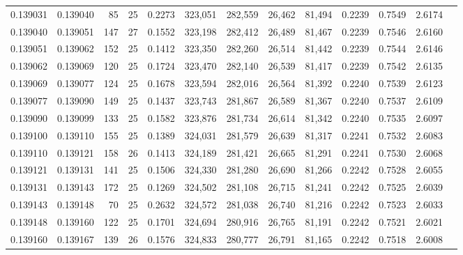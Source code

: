 \begin{tabular}{rrrrrrrrrrrrr}
0.139031 & 0.139040 &    85 &  25 &                                     0.2273 & 323,051 & 282,559 &  26,462 &  81,494 & 0.2239 & 0.7549 & 2.6174 \\
0.139040 & 0.139051 &   147 &  27 &                                     0.1552 & 323,198 & 282,412 &  26,489 &  81,467 & 0.2239 & 0.7546 & 2.6160 \\
0.139051 & 0.139062 &   152 &  25 &                                     0.1412 & 323,350 & 282,260 &  26,514 &  81,442 & 0.2239 & 0.7544 & 2.6146 \\
0.139062 & 0.139069 &   120 &  25 &                                     0.1724 & 323,470 & 282,140 &  26,539 &  81,417 & 0.2239 & 0.7542 & 2.6135 \\
0.139069 & 0.139077 &   124 &  25 &                                     0.1678 & 323,594 & 282,016 &  26,564 &  81,392 & 0.2240 & 0.7539 & 2.6123 \\
0.139077 & 0.139090 &   149 &  25 &                                     0.1437 & 323,743 & 281,867 &  26,589 &  81,367 & 0.2240 & 0.7537 & 2.6109 \\
0.139090 & 0.139099 &   133 &  25 &                                     0.1582 & 323,876 & 281,734 &  26,614 &  81,342 & 0.2240 & 0.7535 & 2.6097 \\
0.139100 & 0.139110 &   155 &  25 &                                     0.1389 & 324,031 & 281,579 &  26,639 &  81,317 & 0.2241 & 0.7532 & 2.6083 \\
0.139110 & 0.139121 &   158 &  26 &                                     0.1413 & 324,189 & 281,421 &  26,665 &  81,291 & 0.2241 & 0.7530 & 2.6068 \\
0.139121 & 0.139131 &   141 &  25 &                                     0.1506 & 324,330 & 281,280 &  26,690 &  81,266 & 0.2242 & 0.7528 & 2.6055 \\
0.139131 & 0.139143 &   172 &  25 &                                     0.1269 & 324,502 & 281,108 &  26,715 &  81,241 & 0.2242 & 0.7525 & 2.6039 \\
0.139143 & 0.139148 &    70 &  25 &                                     0.2632 & 324,572 & 281,038 &  26,740 &  81,216 & 0.2242 & 0.7523 & 2.6033 \\
0.139148 & 0.139160 &   122 &  25 &                                     0.1701 & 324,694 & 280,916 &  26,765 &  81,191 & 0.2242 & 0.7521 & 2.6021 \\
0.139160 & 0.139167 &   139 &  26 &                                     0.1576 & 324,833 & 280,777 &  26,791 &  81,165 & 0.2242 & 0.7518 & 2.6008 \\

\end{tabular}
